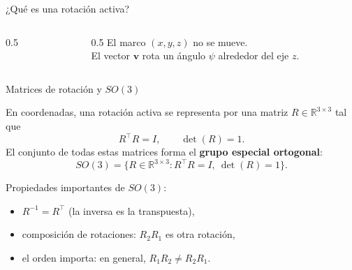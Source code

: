 \documentclass[11pt]{beamer}
\begin{document}
\begin{frame}{¿Qué es una rotación activa?}
\begin{columns}[T]
\begin{column}{0.5\textwidth}
  \end{column}

    \begin{column}{0.5\textwidth}
    El marco \((x,y,z)\) no se mueve.\\[4pt]
    El vector \(\bm{v}\) rota un ángulo \(\psi\) alrededor del eje \(z\).
  \end{column}
\end{columns}

\end{frame}

\begin{frame}{Matrices de rotación y \(SO(3)\)}

En coordenadas, una rotación activa se representa por una matriz
\(R \in \mathbb{R}^{3\times 3}\) tal que
\[
R^{\top}R = I, \qquad \det(R) = 1.
\]
El conjunto de todas estas matrices forma el \textbf{grupo especial ortogonal}:
\[
SO(3) = \{R \in \mathbb{R}^{3\times 3} : R^{\top}R = I,\ \det(R) = 1\}.
\]

\medskip
Propiedades importantes de \(SO(3)\):
\begin{itemize}
  \item \(R^{-1} = R^{\top}\) (la inversa es la transpuesta),
  \item composición de rotaciones: \(R_2 R_1\) es otra rotación,
  \item el orden importa: en general, \(R_1 R_2 \neq R_2 R_1\).
\end{itemize}

\end{frame}
\end{document}
